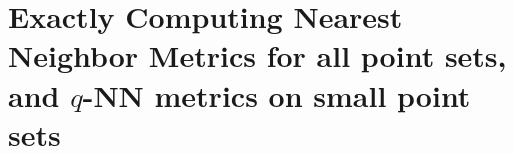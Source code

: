 \section{Exactly Computing Nearest Neighbor Metrics for all point sets, and $q$-NN metrics on
small point sets}\label{sec:metric-equality}








